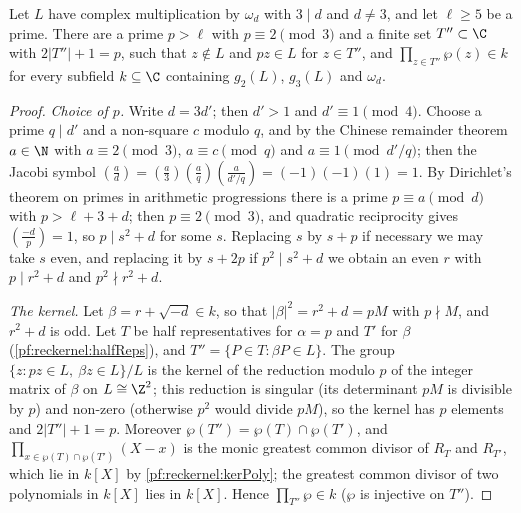 \begin{lemma}\label{pf:reckernel:kerIdeal}
Let $L$ have complex multiplication by $\omega_d$ with $3\mid d$ and $d\ne3$, and let $\ell\ge5$ be a prime. There are
a prime $p>\ell$ with $p\equiv2\pmod3$ and a finite set $T''\subset\C$ with $2|T''|+1=p$, such that $z\notin L$ and $pz\in
L$ for $z\in T''$, and $\prod_{z\in T''}\wp(z)\in k$ for every subfield $k\subseteq\C$ containing $g_2(L)$, $g_3(L)$ and
$\omega_d$.
\end{lemma}

\begin{proof}
\emph{Choice of $p$.} Write $d=3d'$; then $d'>1$ and $d'\equiv1\pmod4$. Choose a prime $q\mid d'$ and a non-square $c$
modulo $q$, and by the Chinese remainder theorem $a\in\N$ with $a\equiv2\pmod3$, $a\equiv c\pmod q$ and
$a\equiv1\pmod{d'/q}$; then the Jacobi symbol $(\frac ad)=(\frac a3)(\frac aq)(\frac a{d'/q})=(-1)(-1)(1)=1$. By
Dirichlet's theorem on primes in arithmetic progressions there is a prime $p\equiv a\pmod d$ with $p>\ell+3+d$; then
$p\equiv2\pmod3$, and quadratic reciprocity gives $(\frac{-d}p)=1$, so $p\mid s^2+d$ for some $s$. Replacing $s$ by $s+p$
if necessary we may take $s$ even, and replacing it by $s+2p$ if $p^2\mid s^2+d$ we obtain an even $r$ with $p\mid
r^2+d$ and $p^2\nmid r^2+d$.

\emph{The kernel.} Let $\beta=r+\sqrt{-d}\in k$, so that $|\beta|^2=r^2+d=pM$ with $p\nmid M$, and $r^2+d$ is odd. Let
$T$ be half representatives for $\alpha=p$ and $T'$ for $\beta$ (\cref{pf:reckernel:halfReps}), and
$T''=\{P\in T:\beta P\in L\}$. The group $\{z:pz\in L,\ \beta z\in L\}/L$ is the kernel of the reduction modulo $p$ of
the integer matrix of $\beta$ on $L\cong\Z^2$; this reduction is singular (its determinant $pM$ is divisible by $p$) and
non-zero (otherwise $p^2$ would divide $pM$), so the kernel has $p$ elements and $2|T''|+1=p$. Moreover
$\wp(T'')=\wp(T)\cap\wp(T')$, and $\prod_{x\in\wp(T)\cap\wp(T')}(X-x)$ is the monic greatest common divisor of $R_T$
and $R_{T'}$, which lie in $k[X]$ by \cref{pf:reckernel:kerPoly}; the greatest common divisor of two polynomials in
$k[X]$ lies in $k[X]$. Hence $\prod_{T''}\wp\in k$ ($\wp$ is injective on $T''$).
\end{proof}

